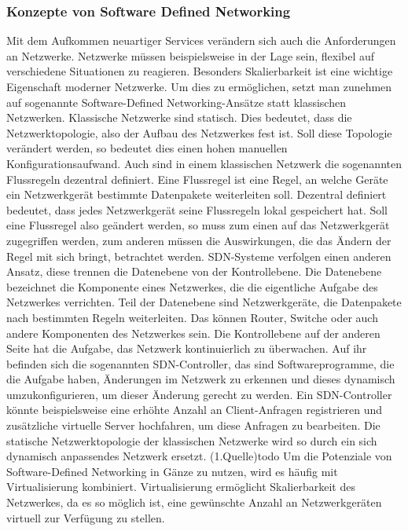 \subsubsection{Konzepte von Software Defined Networking}


Mit dem Aufkommen neuartiger Services verändern sich auch die Anforderungen an Netzwerke. Netzwerke müssen beispielsweise in der Lage sein, flexibel auf verschiedene Situationen zu reagieren. 
Besonders Skalierbarkeit ist eine wichtige Eigenschaft moderner Netzwerke. Um dies zu ermöglichen, setzt man zunehmen auf sogenannte Software-Defined Networking-Ansätze statt klassischen Netzwerken. 
Klassische Netzwerke sind statisch. Dies bedeutet, dass die Netzwerktopologie, also der Aufbau des Netzwerkes fest ist. Soll diese Topologie verändert werden, so bedeutet dies einen hohen manuellen Konfigurationsaufwand. 
Auch sind in einem klassischen Netzwerk die sogenannten Flussregeln dezentral definiert. Eine Flussregel ist eine Regel, an welche Geräte ein Netzwerkgerät bestimmte Datenpakete weiterleiten soll. 
Dezentral definiert bedeutet, dass jedes Netzwerkgerät seine Flussregeln lokal gespeichert hat. Soll eine Flussregel also geändert werden, so muss zum einen auf das Netzwerkgerät zugegriffen werden, 
zum anderen müssen die Auswirkungen, die das Ändern der Regel mit sich bringt, betrachtet werden. SDN-Systeme verfolgen einen anderen Ansatz, diese trennen die Datenebene von der Kontrollebene. 
Die Datenebene bezeichnet die Komponente eines Netzwerkes, die die eigentliche Aufgabe des Netzwerkes verrichten. Teil der Datenebene sind Netzwerkgeräte, die Datenpakete nach bestimmten Regeln weiterleiten. 
Das können Router, Switche oder auch andere Komponenten des Netzwerkes sein. Die Kontrollebene auf der anderen Seite hat die Aufgabe, das Netzwerk kontinuierlich zu überwachen. 
Auf ihr befinden sich die sogenannten SDN-Controller, das sind Softwareprogramme, die die Aufgabe haben, Änderungen im Netzwerk zu erkennen und dieses dynamisch umzukonfigurieren, um dieser Änderung gerecht zu werden. 
Ein SDN-Controller könnte beispielsweise eine erhöhte Anzahl an Client-Anfragen registrieren und zusätzliche virtuelle Server hochfahren, um diese Anfragen zu bearbeiten. 
Die statische Netzwerktopologie der klassischen Netzwerke wird so durch ein sich dynamisch anpassendes Netzwerk ersetzt. (1.Quelle)todo Um die Potenziale von Software-Defined Networking in Gänze zu nutzen, 
wird es häufig mit Virtualisierung kombiniert. Virtualisierung ermöglicht Skalierbarkeit des Netzwerkes, da es so möglich ist, eine gewünschte Anzahl an Netzwerkgeräten virtuell zur Verfügung zu stellen. 
